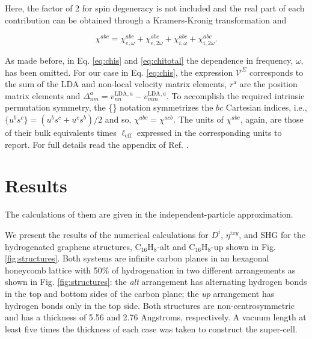 \documentclass[pss]{wiley2sp} %
\begin{document}
\noindent Here, the factor of 2 for spin degeneracy is not included and the real part of each contribution can be obtained through a Kramers-Kronig transformation \cite{tancogne2014effect} and

\begin{equation}\label{eq:chitotal}
    \chi^{abc} = \chi^{abc}_{e,\omega} + \chi^{abc}_{e,2\omega} +
    \chi^{abc}_{i,\omega} + \chi^{abc}_{i,2\omega}
    .
\end{equation}

As made before, in Eq. \ref{eq:chis} and \ref{eq:chitotal} the dependence in frequency, $\omega$, has been omitted. For our case in Eq. \ref{eq:chis}, the expression $\mathcal{V}^{\Sigma}$ corresponds to the sum of the LDA and non-local velocity matrix elements, $r^{\mathrm{a}} $ are the position matrix elements and $\Delta^{a}_{nm} = v^{\text{LDA},a}_{nn} - v^{\text{LDA},a}_{mm} $. To accomplish the required intrinsic permutation symmetry, the \{\} notation symmetrizes the $bc$ Cartesian indices, i.e., $\{u^{b}s^{c}\} = (u^{b}s^{c} + u^{c}s^{b})/{2}$ and so, $\chi^{abc} = \chi^{acb}$. The units of $\chi^{abc} $, again, are those of their bulk equivalents times $\ell_{\text{eff}}$ expressed in the corresponding units to report. For full details read the appendix of Ref. \cite{anderson2015theory}.


\section{Results}\label{sec:results}

\begin{changed}
The calculations of them are given in the independent-particle approximation.
\end{changed}

We present the results of the numerical calculations for {$D^{i}$}, {$\eta^{ixy}$}, and SHG for
the hydrogenated graphene structures, C$_{16}$H$_{8}$-alt and C$_{16}$H$_{8}$-up shown in Fig.
\ref{fig:structures}. Both systems are infinite carbon planes in an
hexagonal honeycomb lattice with 50\% of hydrogenation in two different
arrangements as shown in Fig. \ref{fig:structures}: the \emph{alt} arrangement has
alternating hydrogen bonds in the top and bottom sides of the carbon plane; the
\emph{up} arrangement has hydrogen bonds only in the top
side. Both structures are non-centrosymmetric and has a thickness of 5.56 and
2.76 Angstroms, respectively. A vacuum length at least  five times the
thickness of each case was taken to construct the super-cell.
\end{document}
